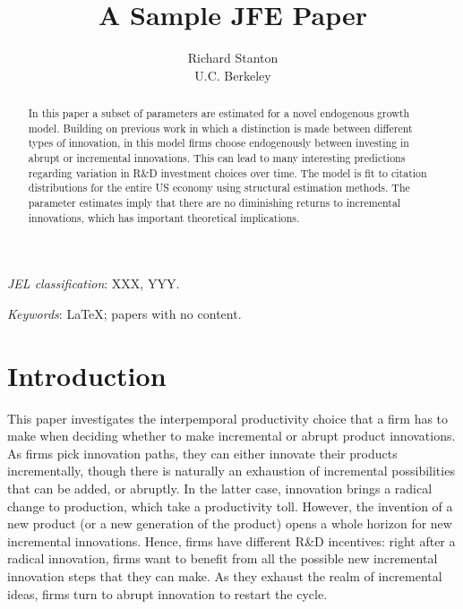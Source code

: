 \documentclass[letterpaper,12pt]{article}
\theoremstyle{definition}
\begin{document}
\title{A Sample JFE Paper}

\author{Richard Stanton\\
  U.C. Berkeley}

\date{}              %


\renewcommand{\thefootnote}{\fnsymbol{footnote}}

\singlespacing

\maketitle

\vspace{-.2in}
\begin{abstract}
\noindent 
In this paper a subset of parameters are estimated for a novel endogenous growth model. Building on previous work in which a distinction is made between different types of innovation, in this model firms choose endogenously between investing in abrupt or incremental innovations. This can lead to many interesting predictions regarding variation in R\&D investment choices over time. The model is fit to citation distributions for the entire US economy using structural estimation methods. The parameter estimates imply that there are no diminishing returns to incremental innovations, which has important theoretical implications.
\end{abstract}

\medskip

\noindent \textit{JEL classification}: XXX, YYY.

\medskip
\noindent \textit{Keywords}: \LaTeX; papers with no content.

\thispagestyle{empty}

\onehalfspacing
\setcounter{footnote}{0}
\renewcommand{\thefootnote}{\arabic{footnote}}
\setcounter{page}{1}

\section{Introduction}

This paper investigates the interpemporal productivity choice that a firm has to make when deciding whether to make incremental or abrupt product innovations. As firms pick innovation paths, they can either innovate their products incrementally, though there is naturally an exhaustion of incremental possibilities that can be added, or abruptly. In the latter case, innovation brings a radical change to production, which take a productivity toll. However, the invention of a new product (or a new generation of the product) opens a whole horizon for new incremental innovations. Hence, firms have different R\&D incentives: right after a radical innovation, firms want to benefit from all the possible new incremental innovation steps that they can make. As they exhaust the realm of incremental ideas, firms turn to abrupt innovation to restart the cycle.
\end{document}
